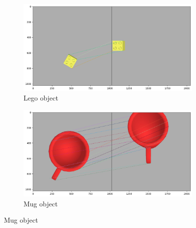 \begin{figure}[h]
    \centering
    \begin{subfigure}[b]{0.49\textwidth}
        \includegraphics[width=\textwidth]{figures/matchLego.png}
        \caption{Lego object}
    \end{subfigure}
    \hfill
    \begin{subfigure}[b]{0.49\textwidth}
        \includegraphics[width=\textwidth]{figures/matchMug.png}
        \caption{Mug object}
    \end{subfigure}


\end{figure}
